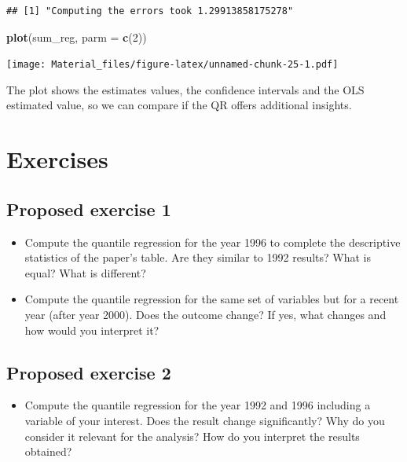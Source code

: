\documentclass[]{book}
\newenvironment{Shaded}{\begin{snugshade}}{\end{snugshade}}
\newcommand{\KeywordTok}[1]{\textcolor[rgb]{0.13,0.29,0.53}{\textbf{#1}}}
\newcommand{\DataTypeTok}[1]{\textcolor[rgb]{0.13,0.29,0.53}{#1}}
\newcommand{\DecValTok}[1]{\textcolor[rgb]{0.00,0.00,0.81}{#1}}
\newcommand{\NormalTok}[1]{#1}
\providecommand{\tightlist}{%
  \setlength{\itemsep}{0pt}\setlength{\parskip}{0pt}}
\begin{document}
\begin{verbatim}
## [1] "Computing the errors took 1.29913858175278"
\end{verbatim}

\begin{Shaded}
\begin{Highlighting}[]
\KeywordTok{plot}\NormalTok{(sum_reg, }\DataTypeTok{parm =} \KeywordTok{c}\NormalTok{(}\DecValTok{2}\NormalTok{))}
\end{Highlighting}
\end{Shaded}

\texttt{[image: Material\_files/figure-latex/unnamed-chunk-25-1.pdf]}

The plot shows the estimates values, the confidence intervals and the
OLS estimated value, so we can compare if the QR offers additional
insights.

\section{Exercises}\label{exercises}

\subsection{Proposed exercise 1}\label{proposed-exercise-1}

\begin{itemize}
\tightlist
\item
  Compute the quantile regression for the year 1996 to complete the
  descriptive statistics of the paper's table. Are they similar to 1992
  results? What is equal? What is different?
\item
  Compute the quantile regression for the same set of variables but for
  a recent year (after year 2000). Does the outcome change? If yes, what
  changes and how would you interpret it?
\end{itemize}

\subsection{Proposed exercise 2}\label{proposed-exercise-2}

\begin{itemize}
\tightlist
\item
  Compute the quantile regression for the year 1992 and 1996 including a
  variable of your interest. Does the result change significantly? Why
  do you consider it relevant for the analysis? How do you interpret the
  results obtained?
\end{itemize}
\end{document}
